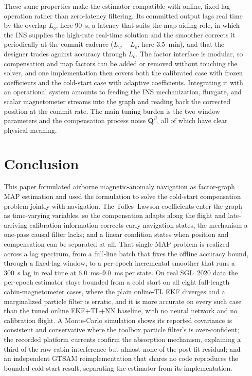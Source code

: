 \documentclass{IEEEtaes}
\begin{document}
These same properties make the estimator compatible with online, fixed-lag
operation rather than zero-latency filtering. Its committed output lags real time by
the overlap $L_o$, here \SI{90}{\second}, a latency that suits the map-aiding role,
in which the INS supplies the high-rate real-time solution and the smoother corrects
it periodically at the commit cadence ($L_w-L_o$, here \SI{3.5}{\minute}), and that
the designer trades against accuracy through $L_o$. The factor interface is modular, so
compensation and map factors can be added or removed without touching
the solver, and one implementation then covers both the calibrated case with frozen
coefficients and the cold-start case with adaptive coefficients. Integrating it with an operational system amounts to feeding
the INS mechanization, fluxgate, and scalar magnetometer streams into the graph and
reading back the corrected position at the commit rate. The main tuning burden is
the two window parameters and the compensation process noise $\mathbf{Q}^{\beta}$,
all of which have clear physical meaning.

\section{Conclusion}\label{sec:conclusion}
This paper formulated airborne magnetic-anomaly navigation as factor-graph MAP
estimation and used the formulation to solve the cold-start compensation problem
jointly with navigation. The Tolles--Lawson coefficients enter the graph as
time-varying variables, so the compensation adapts along the flight and
late-arriving calibration information corrects early navigation states, the
mechanism a one-pass causal filter lacks; and a linear condition states when
position and compensation can be separated at all. That single MAP problem is
realized across a lag spectrum, from a full-line batch that fixes the offline
accuracy bound, through a fixed-lag window, to a per-epoch incremental smoother that
runs a \SI{300}{\second} lag in real time at
\SIrange{6.0}{9.0}{\milli\second} per state. On real SGL~2020 data the
per-epoch estimator stays bounded from a cold start on all eight full-length
cabin-magnetometer cases, where the plain online-TL EKF diverges and a marginalized
particle filter is erratic, and it is more accurate on every such case than the
tuned online EKF+TL+NN baseline, with no neural network and no calibration flight. A Monte-Carlo
simulation shows its reported covariance is consistent and conservative
where the toolbox particle filter's is over-confident; the recorded platform
currents confirm the absorption mechanism, explaining a third of the raw cabin
interference but almost none of the post-fit residual; and an independent GTSAM
reimplementation that shares no code reproduces the bounded cold-start result,
separating the estimator from its implementation.
\end{document}
